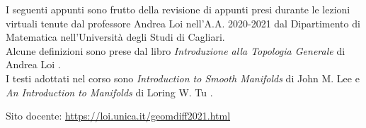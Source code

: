 I seguenti appunti sono frutto della revisione di appunti presi durante le lezioni virtuali tenute dal professore Andrea Loi nell'A.A. 2020-2021 dal Dipartimento di Matematica nell'Università degli Studi di Cagliari. \\
Alcune definizioni sono prese dal libro \textit{Introduzione alla Topologia Generale} di Andrea Loi \autocite{loi}.\\
I testi adottati nel corso sono \textit{Introduction to Smooth Manifolds} di John M. Lee \cite{lee} e \textit{An Introduction to Manifolds} di Loring W. Tu \cite{tu}.

Sito docente: \url{https://loi.unica.it/geomdiff2021.html}

